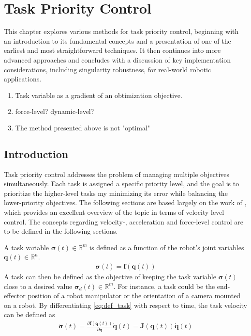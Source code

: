 \chapter{Task Priority Control}

This chapter explores various methods for task priority control, beginning with
an introduction to its fundamental concepts and a presentation of one of the
earliest and most straightforward techniques. It then continues into more advanced
approaches and concludes with a discussion of key implementation considerations,
including singularity robustness, for real-world robotic applications.

{
    \color{red}
    \begin{enumerate}
        \item Task variable as a gradient of an obtimization objective.
        \item force-level? dynamic-level?
        \item The method presented above is not "optimal"
    \end{enumerate}
}
\section{Introduction}
\label{sec:tpc_intro}
Task priority control addresses the problem of managing multiple objectives simultaneously.
Each task is assigned a specific priority level, and the goal is to prioritize the higher-level
tasks my minimizing its error while balancing the lower-priority objectives. The
following sections are based largely on the work of \cite{antonelli2009}, which provides
an excellent overview of the topic in terms of velocity level control. The concepts
regarding velocity-, acceleration and force-level control are to be defined in the
following sections.

A task variable $\bm{\sigma}(t) \in \mathbb{R}^m$ is defined as a function of the robot's
joint variables $\bm{q}(t) \in \mathbb{R}^n$.
\begin{align}
    \bm{\sigma}(t) = \bm{f}(\bm{q}(t)) \label{eq:def_task}
\end{align}
A task can then be defined as the objective of keeping the task variable $\bm{\sigma}(t)$
close to a desired value $\bm{\sigma}_d(t) \in \mathbb{R}^m$. For instance, a task could
be the end-effector position of a robot manipulator or the orientation of a camera mounted
on a robot. By differentiating \autoref{eq:def_task} with respect to time, the task velocity
can be defined as
\begin{align}
    \dot{\bm{\sigma}}(t) = \frac{\partial \bm{f}(\bm{q}(t))}{\partial \bm{q}} \dot{\bm{q}}(t)= \bm{J}(\bm{q}(t)) \dot{\bm{q}}(t) \label{eq:def_task_jacobian}
\end{align}

